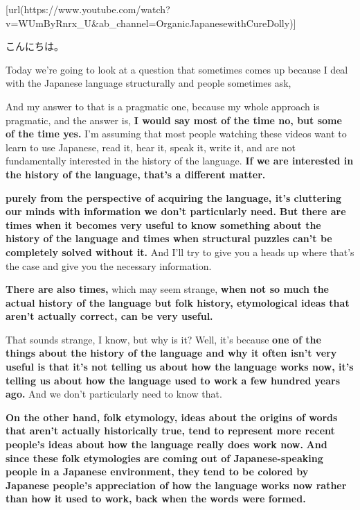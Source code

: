 \startsectionlevel[title={{\bf 95. Using Word-History the Smart Way どうも、やっぱり、やはり}},reference={using-word-history-the-smart-way-どうもやっぱりやはり}]

[url(https://www.youtube.com/watch?v=WUmByRnrx_U&ab_channel=OrganicJapanesewithCureDolly)]

こんにちは。

Today we're going to look at a question that sometimes comes up because I deal with the Japanese language structurally and people sometimes ask, {\bf {}}

{}

And my answer to that is a pragmatic one, because my whole approach is pragmatic, and the answer is, {\bf I would say most of the time no, but some of the time yes.} I'm assuming that most people watching these videos want to learn to use Japanese, read it, hear it, speak it, write it, and are not fundamentally interested in the history of the language. {\bf If we are interested in the history of the language, that's a different matter.}

{\bf purely from the perspective of acquiring the language, it's cluttering our minds with information we don't particularly need.} {\bf But there are times when it becomes very useful to know something about the history of the language and times when structural puzzles can't be completely solved without it.} And I'll try to give you a heads up where that's the case and give you the necessary information.

{\bf There are also times,} which may seem strange, {\bf when not so much the actual history of the language but folk history, etymological ideas that aren't actually correct, can be very useful.}

{}

That sounds strange, I know, but why is it? Well, it's because {\bf one of the things about the history of the language and why it often isn't very useful is that it's not telling us about how the language works now, it's telling us about how the language used to work a few hundred years ago.} And we don't particularly need to know that.

{\bf On the other hand, folk etymology, ideas about the origins of words that aren't actually historically true, tend to represent more recent people's ideas about how the language really does work now.} {\bf And since these folk etymologies are coming out of Japanese-speaking people in a Japanese environment, they tend to be colored by Japanese people's appreciation of how the language works now rather than how it used to work, back when the words were formed.}

